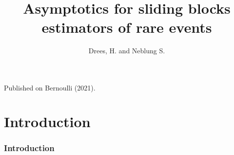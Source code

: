\documentclass{beamer}
\author{Drees, H. and Neblung S.}
\title{Asymptotics for sliding blocks estimators of
rare events}
\date{}
\begin{document}
\begin{frame}
\titlepage

\begin{center}
    \vspace{-16ex}
    Published on Bernoulli (2021).
\end{center}
\end{frame}

\section{Introduction}
\begin{frame}
    \frametitle{Introduction}

    

\end{frame}
\end{document}
